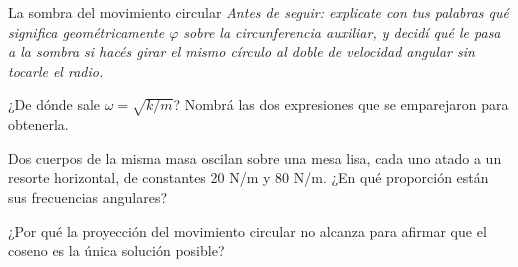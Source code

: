 \documentclass[11pt,openany]{book}
\begin{document}
\begin{bloque}{La sombra del movimiento circular}
\textit{Antes de seguir: explicate con tus palabras qué significa geométricamente $\varphi$ sobre la circunferencia auxiliar, y decidí qué le pasa a la sombra si hacés girar el mismo círculo al doble de velocidad angular sin tocarle el radio.}
\end{bloque}

\begin{chequeo}
\item ¿De dónde sale $\omega = \sqrt{k/m}$? Nombrá las dos expresiones que se emparejaron para obtenerla.
\item Dos cuerpos de la misma masa oscilan sobre una mesa lisa, cada uno atado a un resorte horizontal, de constantes 20 N/m y 80 N/m. ¿En qué proporción están sus frecuencias angulares?
\item ¿Por qué la proyección del movimiento circular no alcanza para afirmar que el coseno es la única solución posible?
\end{chequeo}
\end{document}
